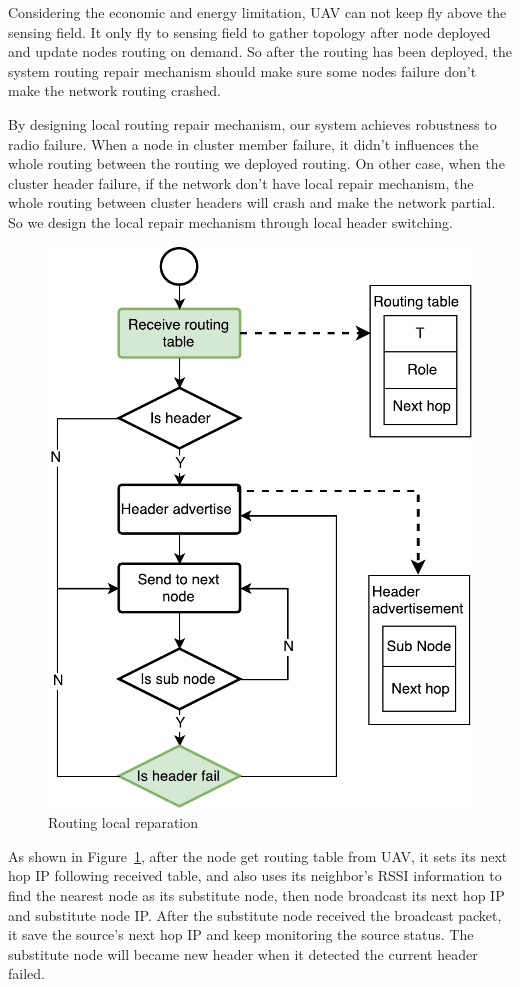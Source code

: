Considering the economic and energy limitation, UAV can not keep fly above the sensing field. It only fly to sensing field to gather topology after node deployed and update nodes routing on demand. So after the routing has been deployed, the system routing repair mechanism should make sure some nodes failure don't make the network routing crashed.


By designing local routing repair mechanism, our system achieves robustness to radio failure. When a node in cluster member failure, it didn't influences the whole routing between the routing we deployed routing. On other case, when the cluster header failure, if the network don't have local repair mechanism, the whole routing between cluster headers will crash and make the network partial. So we design the local repair mechanism through local header switching. 

\begin{figure}[htbp]
	\centering
	\includegraphics[width=.65\columnwidth]{Figure/routing-flow}
	\vspace{-0.1in}
	\caption{Routing local reparation}
	\label{routing-flow}
	\vspace{-0.1in}
\end{figure}

As shown in Figure~\ref{routing-flow}, after the node get routing table from
UAV, it sets its next hop IP following received table, and also uses its
neighbor's RSSI information to find the nearest node as its substitute node,
then node broadcast its next hop IP and substitute node IP. After the substitute
node received the broadcast packet, it save the source's next hop IP and keep
monitoring the source status. The substitute node will became new header when it
detected the current header failed.

